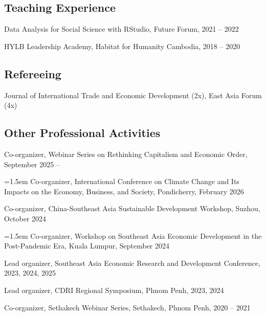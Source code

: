 \documentclass[10pt,a4paper]{article}
\begin{document}
\subsection*{Teaching Experience}

Data Analysis for Social Science with RStudio, Future Forum, 2021 -- 2022

HYLB Leadership Academy, Habitat for Humanity Cambodia, 2018 -- 2020

\subsection*{Refereeing}

Journal of International Trade and Economic Development (2x), East Asia Forum (4x)


\subsection*{Other Professional Activities}

Co-organizer, Webinar Series on Rethinking Capitalism and Economic Order, September 2025 --

\hangindent=1.5em
Co-organizer, International Conference on Climate Change and Its Impacts on the Economy, Business, and Society, Pondicherry, February 2026 

Co-organizer, China-Southeast Asia Sustainable Development Workshop, Suzhou, October 2024

\hangindent=1.5em
Co-organizer, Workshop on Southeast Asia Economic Development in the Post-Pandemic Era, Kuala Lumpur, September 2024

Lead organizer, Southeast Asia Economic Research and Development Conference, 2023, 2024, 2025

Lead organizer, CDRI Regional Symposium, Phnom Penh, 2023, 2024

Co-organizer, Sethakech Webinar Series, Sethakech, Phnom Penh, 2020 -- 2021
\end{document}
